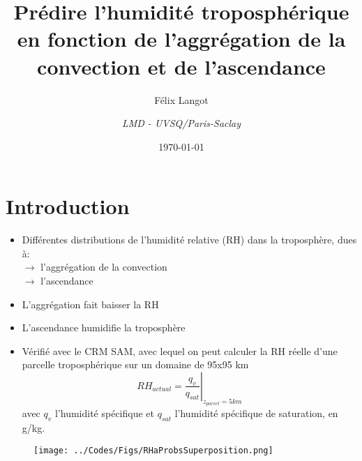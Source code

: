 \documentclass[10pt]{beamer}
\title{Prédire l'humidité troposphérique en fonction de l'aggrégation de la convection et de l'ascendance}
\subtitle{Félix Langot}
\date{\today}
\author{\textit{LMD - UVSQ/Paris-Saclay}}
\institute{}
\begin{document}
\maketitle

\section*{Introduction}
\begin{frame}{\secname}

    \begin{itemize}
        \item Différentes distributions de l'humidité relative (RH) dans la troposphère, dues à: \\
        $\rightarrow$ l'aggrégation de la convection \\
        $\rightarrow$ l'ascendance
        \item L'aggrégation fait baisser la RH 
        \item L'ascendance humidifie la troposphère
        \item Vérifié avec le CRM SAM, avec lequel on peut calculer la RH réelle d'une parcelle troposphérique sur un domaine de 95x95 km
        $$
        RH_{actual} = \left.\frac{q_v}{q_{sat}}\right|_{z_{parcel}=5km}
        $$
        avec $q_v$ l'humidité spécifique et $q_{sat}$ l'humidité spécifique de saturation, en g/kg.
    \end{itemize}

\end{frame}

\begin{frame}{\secname}
    
    \begin{figure}
        \centering
        \texttt{[image: ../Codes/Figs/RHaProbsSuperposition.png]}
        \label{RHactual}
    \end{figure}

\end{frame}
\end{document}
